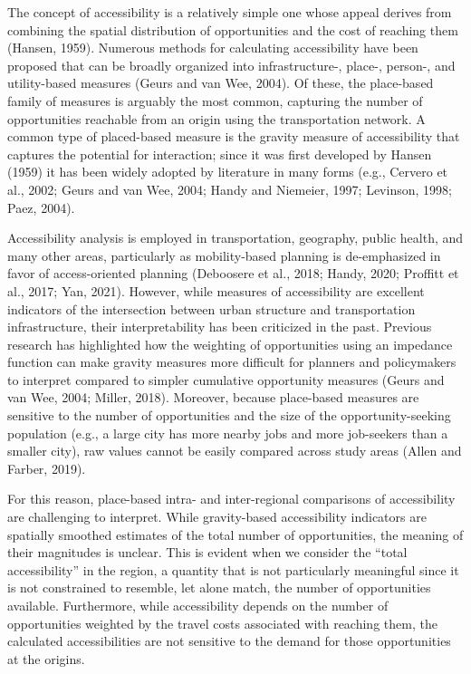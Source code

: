 \documentclass[]{elsarticle} %
\begin{document}
The concept of accessibility is a relatively simple one whose appeal
derives from combining the spatial distribution of opportunities and the
cost of reaching them (Hansen, 1959). Numerous methods for calculating
accessibility have been proposed that can be broadly organized into
infrastructure-, place-, person-, and utility-based measures (Geurs and
van Wee, 2004). Of these, the place-based family of measures is arguably
the most common, capturing the number of opportunities reachable from an
origin using the transportation network. A common type of placed-based
measure is the gravity measure of accessibility that captures the
potential for interaction; since it was first developed by Hansen (1959)
it has been widely adopted by literature in many forms (e.g., Cervero et
al., 2002; Geurs and van Wee, 2004; Handy and Niemeier, 1997; Levinson,
1998; Paez, 2004).

Accessibility analysis is employed in transportation, geography, public
health, and many other areas, particularly as mobility-based planning is
de-emphasized in favor of access-oriented planning (Deboosere et al.,
2018; Handy, 2020; Proffitt et al., 2017; Yan, 2021). However, while
measures of accessibility are excellent indicators of the intersection
between urban structure and transportation infrastructure, their
interpretability has been criticized in the past. Previous research has
highlighted how the weighting of opportunities using an impedance
function can make gravity measures more difficult for planners and
policymakers to interpret compared to simpler cumulative opportunity
measures (Geurs and van Wee, 2004; Miller, 2018). Moreover, because
place-based measures are sensitive to the number of opportunities and
the size of the opportunity-seeking population (e.g., a large city has
more nearby jobs and more job-seekers than a smaller city), raw values
cannot be easily compared across study areas (Allen and Farber, 2019).

For this reason, place-based intra- and inter-regional comparisons of
accessibility are challenging to interpret. While gravity-based
accessibility indicators are spatially smoothed estimates of the total
number of opportunities, the meaning of their magnitudes is unclear.
This is evident when we consider the ``total accessibility'' in the
region, a quantity that is not particularly meaningful since it is not
constrained to resemble, let alone match, the number of opportunities
available. Furthermore, while accessibility depends on the number of
opportunities weighted by the travel costs associated with reaching
them, the calculated accessibilities are not sensitive to the demand for
those opportunities at the origins.
\end{document}
